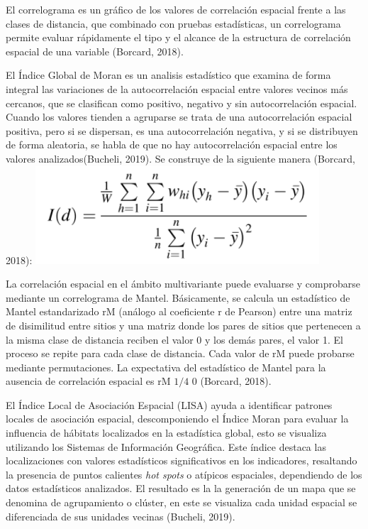 \documentclass[11pt,]{article}
\begin{document}
El correlograma es un gráfico de los valores de correlación espacial
frente a las clases de distancia, que combinado con pruebas
estadísticas, un correlograma permite evaluar rápidamente el tipo y el
alcance de la estructura de correlación espacial de una variable
(Borcard, 2018).

El Índice Global de Moran es un analisis estadístico que examina de
forma integral las variaciones de la autocorrelación espacial entre
valores vecinos más cercanos, que se clasifican como positivo, negativo
y sin autocorrelación espacial. Cuando los valores tienden a agruparse
se trata de una autocorrelación espacial positiva, pero si se dispersan,
es una autocorrelación negativa, y si se distribuyen de forma aleatoria,
se habla de que no hay autocorrelación espacial entre los valores
analizados(Bucheli, 2019). Se construye de la siguiente manera (Borcard,
2018): \includegraphics{moran1.PNG}

La correlación espacial en el ámbito multivariante puede evaluarse y
comprobarse mediante un correlograma de Mantel. Básicamente, se calcula
un estadístico de Mantel estandarizado rM (análogo al coeficiente r de
Pearson) entre una matriz de disimilitud entre sitios y una matriz donde
los pares de sitios que pertenecen a la misma clase de distancia reciben
el valor 0 y los demás pares, el valor 1. El proceso se repite para cada
clase de distancia. Cada valor de rM puede probarse mediante
permutaciones. La expectativa del estadístico de Mantel para la ausencia
de correlación espacial es rM \(1/4\) 0 (Borcard, 2018).

El Índice Local de Asociación Espacial (LISA) ayuda a identificar
patrones locales de asociación espacial, descomponiendo el Índice Moran
para evaluar la influencia de hábitats localizados en la estadística
global, esto se visualiza utilizando los Sistemas de Información
Geográfica. Este índice destaca las localizaciones con valores
estadísticos significativos en los indicadores, resaltando la presencia
de puntos calientes \emph{hot spots} o atípicos espaciales, dependiendo
de los datos estadísticos analizados. El resultado es la la generación
de un mapa que se denomina de agrupamiento o clúster, en este se
visualiza cada unidad espacial se diferenciada de sus unidades vecinas
(Bucheli, 2019).
\end{document}
